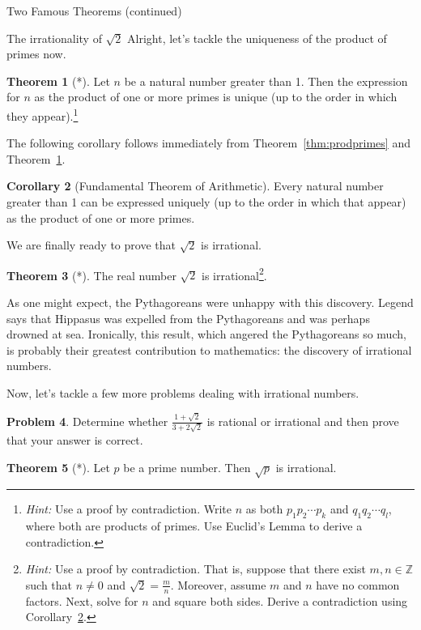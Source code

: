 \documentclass[11pt]{article}
\theoremstyle{definition}
\newtheorem{theorem}{Theorem}[section]
\newtheorem{corollary}[theorem]{Corollary}
\newtheorem{problem}[theorem]{Problem}
\begin{document}
\begin{section}{Two Famous Theorems (continued)}
\begin{subsection}{The irrationality of $\sqrt{2}$}
Alright, let's tackle the uniqueness of the product of primes now.

\begin{theorem}[*]\label{thm:unique}
Let $n$ be a natural number greater than 1.  Then the expression for $n$ as the product of one or more primes is unique (up to the order in which they appear).\footnote{\emph{Hint:} Use a proof by contradiction.  Write $n$ as both $p_1 p_2 \cdots p_k$ and $q_1 q_2 \cdots q_l$, where both are products of primes.  Use Euclid's Lemma to derive a contradiction.}
\end{theorem}

The following corollary follows immediately from Theorem~\ref{thm:prodprimes} and Theorem~\ref{thm:unique}.

\begin{corollary}[Fundamental Theorem of Arithmetic]\label{cor:FTA}
Every natural number greater than 1 can be expressed uniquely (up to the order in which that appear) as the product of one or more primes.
\end{corollary}

We are finally ready to prove that $\sqrt{2}$ is irrational.

\begin{theorem}[*]
\label{thm:sqrt2}
The real number $\sqrt{2}$ is irrational\footnote{\emph{Hint:} Use a proof by contradiction.  That is, suppose that there exist $m,n\in\mathbb{Z}$ such that $n\ne 0$ and $\sqrt{2}=\frac{m}{n}$. Moreover, assume $m$ and $n$ have no common factors.  Next, solve for $n$ and square both sides.  Derive a contradiction using Corollary~\ref{cor:FTA}.}.
\end{theorem}

As one might expect, the Pythagoreans were unhappy with this discovery. Legend says that Hippasus was expelled from the Pythagoreans and was perhaps drowned at sea. Ironically, this result, which angered the Pythagoreans so much, is probably their greatest contribution to mathematics: the discovery of irrational numbers.

Now, let's tackle a few more problems dealing with irrational numbers.

\begin{problem}
Determine whether $\displaystyle \frac{1+\sqrt{2}}{3+2\sqrt{2}}$ is rational or irrational and then prove that your answer is correct.
\end{problem}

\begin{theorem}[*]\label{thm:sqrtp}
Let $p$ be a prime number.  Then $\sqrt{p}$ is irrational.
\end{theorem}


\end{subsection}
\end{section}
\end{document}
